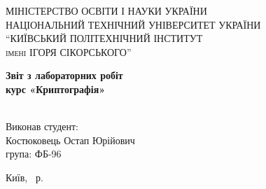 \documentclass[14pt,a4paper,report]{ncc}
\begin{document}
\renewcommand{\chaptername}{Лабораторна робота}
\def\contentsname{Зміст}

\begin{titlepage}
\begin{center}
\textsc{МІНІСТЕРСТВО ОСВІТИ І НАУКИ УКРАЇНИ\\[2mm]
НАЦІОНАЛЬНИЙ ТЕХНІЧНИЙ УНІВЕРСИТЕТ УКРАЇНИ\\[2mm]
“КИЇВСЬКИЙ ПОЛІТЕХНІЧНИЙ ІНСТИТУТ\\[2mm]
iменi ІГОРЯ СІКОРСЬКОГО”}

\vfill

\textbf{Звіт з лабораторних робіт\\[3mm]
курс «Криптографія»\\[6mm]
\\[20mm]
}
\end{center}

\hfill
\begin{minipage}{.5\textwidth}
Виконав студент:\\[2mm] 
Костюковець Остап Юрійович\\
група: ФБ-96\\[5mm]


\end{minipage}%
\vfill
\begin{center}
 Київ, \theyear\ р.
\end{center}
\end{titlepage}

\newpage





\end{document}
